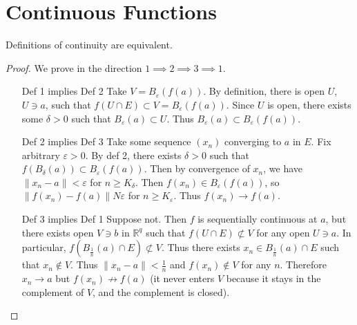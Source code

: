 \section{Continuous Functions}

\begin{proposition}
	Definitions of continuity are equivalent.
\end{proposition}
\begin{proof}
	We prove in the direction $1\implies 2\implies 3 \implies 1$.
	\begin{itemize}
		\item [Def 1 implies Def 2] Take $V = B_{\varepsilon} \left( f(a) \right) $. By definition, there is open $U$, $U \ni a$, such that $f(U \cap E) \subset V = B_{\varepsilon}\left( f(a) \right) $.
			Since $U$ is open, there exists some $\delta >0$ such that $B_\varepsilon(a) \subset U$. Thus $B_\varepsilon(a) \subset B_\varepsilon\left( f(a) \right) $.
		\item [Def 2 implies Def 3] Take some sequence $(x_n)$ converging to $a$ in $E$. Fix arbitrary $\varepsilon>0$. By def 2, there exists $\delta>0$ such that $f\left( B_\delta(a) \right)  \subset B_\varepsilon\left( f(a) \right) $.
			Then by convergence of $x_n$, we have $\|x_n - a\|<\varepsilon$ for $n \ge K_\delta$. Then $f(x_n) \in B_\varepsilon(f(a))$, so $\|f(x_n) - f(a)\|N \varepsilon$ for $n \ge K_\varepsilon$. Thus $f(x_n) \to  f(a)$.
		\item [Def 3 implies Def 1]
		Suppose not. Then $f$ is sequentially continuous at $a$, but there exists open $V \ni b$ in $\mathbb{R}^q$ such that $f(U \cap E) \not \subset V$ for any open $U \ni a$.
		In particular, $f\left( B_{\frac{1}{n}}(a) \cap E\right) \not \subset V$. Thus there exists $x_n \in B_{\frac{1}{n}} (a) \cap E$ such that $x_n \not\in V$. Thus $\|x_n - a\|< \frac{1}{n}$ and $f(x_n) \not\in V$ for any $n$. Therefore $x_n \to a$ but $f(x_n) \not \to f(a)$ (it never enters $V$ because it stays in the complement of  $V$, and the complement is closed).
	\end{itemize}
\end{proof}

